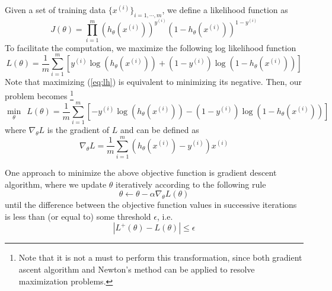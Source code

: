 \documentclass[10pt,a4paper]{article}
\begin{document}
  Given a set of training data $\{x^{(i)}\}_{i=1,\cdots,m}$, we define a likelihood function as
  \begin{equation}
    J(\theta) = \prod^m_{i=1} (h_\theta(x^{(i)}))^{y^{(i)}} (1-h_\theta (x^{(i)}))^{1-y^{(i)}}
  \end{equation}
  To facilitate the computation, we maximize the following log likelihood function
  \begin{equation}
    L(\theta) = \frac{1}{m} \sum^m_{i=1} [ y^{(i)} \log(h_\theta(x^{(i)})) + (1-y^{(i)}) \log (1 - h_\theta(x^{(i)}))  ]
  \label{eq:lh}
  \end{equation}  
  Note that maximizing (\ref{eq:lh}) is equivalent to minimizing its negative. Then, our problem becomes \footnote{Note that it is not a must to perform this transformation, since both gradient ascent algorithm and Newton's method can be applied to resolve maximization problems.}
  \begin{equation}
    \min_\theta ~~ L(\theta) = \frac{1}{m} \sum^m_{i=1} [ -y^{(i)} \log(h_\theta(x^{(i)})) - (1-y^{(i)}) \log (1 - h_\theta(x^{(i)}))  ] 
  \label{eq:obj}
  \end{equation} 
  where $\nabla_{\theta}L$ is the gradient of $L$ and can be defined as
  \begin{equation}
    \nabla_{\theta}L = \frac{1}{m}\sum_{i=1}^{m}(h_{\theta}(x^{(i)})-y^{(i)})x^{(i)} 
  \end{equation} 

  One approach to minimize the above objective function is gradient descent algorithm, where we update $\theta$ iteratively according to the following rule
  \begin{equation}
    \theta \leftarrow \theta - \alpha \nabla_\theta L(\theta)
  \end{equation}
  until the difference between the objective function values in successive iterations is less than (or equal to) some threshold $\epsilon$, i.e.
  \begin{equation}
    |L^+(\theta) - L(\theta)| \leq \epsilon
  \label{eq:stop}
  \end{equation}
\end{document}
